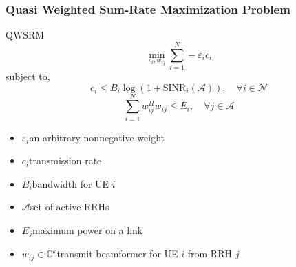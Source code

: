 \documentclass[usenames,dvipsnames]{beamer}
\begin{document}
\begin{frame}
  \frametitle{Quasi Weighted Sum-Rate Maximization Problem}
  \begin{exampleblock}{QWSRM}
    \[
      \min_{c_{i},w_{ij}} \sum_{i=1}^{N}-\varepsilon_{i}c_{i}
    \]
    subject to,
    \[
      c_{i} \leq B_{i}\log(1+\text{SINR}_{i}(\mathcal{A})),\quad \forall i\in \mathcal{N}
    \]
    \[
      \sum_{i=1}^{N}w_{ij}^{H}w_{ij}\leq E_{i},\quad \forall j\in \mathcal{A}
    \]
  \end{exampleblock}
  \begin{itemize}
    \item $\varepsilon_{i}$\quad an arbitrary nonnegative weight
    \item $c_{i}$\quad transmission rate
    \item $B_{i}$\qquad bandwidth for UE $i$
    \item $\mathcal{A}$\qquad set of active RRHs
    \item $E_{j}$\quad maximum power on a link
    \item $w_{ij}\in\mathbb{C}^{k}$\quad transmit beamformer for UE $i$ from RRH $j$
  \end{itemize}
\end{frame}
\end{document}
